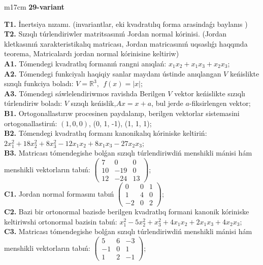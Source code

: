 \documentclass{article}
\begin{document}
\begin{tabular}{m{17cm}}
\textbf{29-variant}
\newline

\textbf{T1.} İnertsiya nızamı. (invariantlar,  eki kvadratılıq forma arasindaǵı baylanıs ) \\
\textbf{T2.} Sızıqlı túrlendiriwler matritsasınıń Jordan normal kórinisi. (Jordan kletkasınıń xarakteristikalıq matricası, Jordan matricasınıń uqsaslıǵı haqqında teorema,  Matricalardı jordan normal kórinisine keltiriw) \\
\textbf{A1.} Tómendegi kvadratlıq formanıń rangni anıqlań: \(x_{1}x_{2} + x_{1}x_{3} + x_{2}x_{3}\); \\
\textbf{A2.} Tómendegi funkciyalı haqiqiy sanlar maydanı ústinde anıqlangan \(V\) keńislikte sızıqlı funkciya boladı: \(V = \mathbb{R}^{3},\ \ f(x) = |x|\); \\
\textbf{A3.} Tómendegi sáwlelendiriwmos ravishda Berilgen \(V\) vektor keńislikte sızıqlı túrlendiriw boladı: \(V\) sızıqlı keńislik,\(Ax = x + a\), bul jerde \(a\)-fiksirlengen vektor; \\
\textbf{B1.} Ortogonallastırıw procesinen paydalanıp, berilgen vektorlar sistemasini ortogonallastirıń: \((1,0,0)\), (0, 1, -1), (1, 1, 1); \\
\textbf{B2.} Tómendegi kvadratlıq formanı kanonikalıq kóriniske keltiriń: \(2x_{1}^{2} + 18x_{2}^{2} + 8x_{3}^{2} - 12x_{1}x_{2} + 8x_{1}x_{3} - 27x_{2}x_{3}\); \\
\textbf{B3.} Matricası tómendegishe bolǵan sızıqlı túrlendiriwdiń menshikli mánisi hám menshikli vektorların tabıń: \(\begin{pmatrix} 7 & 0 & 0 \\ 10 & - 19 & 0 \\ 12 & - 24 & 13 \end{pmatrix}\); \\
\textbf{C1.} Jordan normal formasını tabıń \(\begin{pmatrix} 0 & 0 & 1 \\ 1 & 4 & 0 \\  - 2 & 0 & 2 \end{pmatrix}\); \\
\textbf{C2.} Bazi bir ortonormal bazisde berilgen kvadratlıq formani kanonik kóriniske keltiriwshi ortonormal bazisin tabıń: \(x_{1}^{2} - 5x_{2}^{2} + x_{3}^{2} + 4x_{1}x_{2} + 2x_{1}x_{3} + 4x_{2}x_{3}\); \\
\textbf{C3.} Matricası tómendegishe bolǵan sızıqlı túrlendiriwdiń menshikli mánisi hám menshikli vektorların tabıń: \(\begin{pmatrix} 5 & 6 & - 3 \\  - 1 & 0 & 1 \\ 1 & 2 & - 1 \end{pmatrix}\); \\

\end{tabular}
\vspace{1cm}
\end{document}

